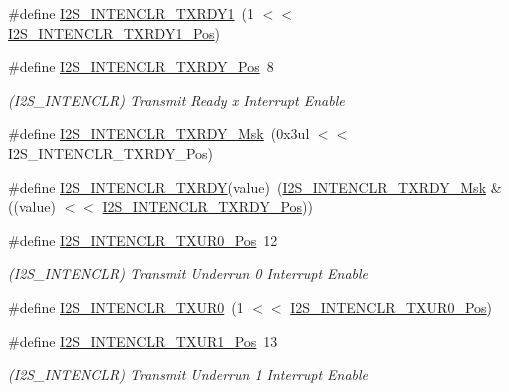 \begin{DoxyCompactItemize}
\#define \mbox{\hyperlink{group___s_a_m_d21___i2_s_gac3e4c3ba6f23da81d38341a66e17d7b7}{I2\+S\+\_\+\+I\+N\+T\+E\+N\+C\+L\+R\+\_\+\+T\+X\+R\+D\+Y1}}~(1 $<$$<$ \mbox{\hyperlink{group___s_a_m_d21___i2_s_gad9aeb6db3a8f09c6c6d586b64a98e4c3}{I2\+S\+\_\+\+I\+N\+T\+E\+N\+C\+L\+R\+\_\+\+T\+X\+R\+D\+Y1\+\_\+\+Pos}})
\item 
\#define \mbox{\hyperlink{group___s_a_m_d21___i2_s_gafc89b68c83bd2907f5c7a91cd36a667f}{I2\+S\+\_\+\+I\+N\+T\+E\+N\+C\+L\+R\+\_\+\+T\+X\+R\+D\+Y\+\_\+\+Pos}}~8
\begin{DoxyCompactList}\small\item\em (I2\+S\+\_\+\+I\+N\+T\+E\+N\+C\+LR) Transmit Ready x Interrupt Enable \end{DoxyCompactList}\item 
\#define \mbox{\hyperlink{group___s_a_m_d21___i2_s_ga4478cdcdd49295aa9290fe7cbaa24402}{I2\+S\+\_\+\+I\+N\+T\+E\+N\+C\+L\+R\+\_\+\+T\+X\+R\+D\+Y\+\_\+\+Msk}}~(0x3ul $<$$<$ I2\+S\+\_\+\+I\+N\+T\+E\+N\+C\+L\+R\+\_\+\+T\+X\+R\+D\+Y\+\_\+\+Pos)
\item 
\#define \mbox{\hyperlink{group___s_a_m_d21___i2_s_gafaf0d1c25089b67ff674b4082c9e3c57}{I2\+S\+\_\+\+I\+N\+T\+E\+N\+C\+L\+R\+\_\+\+T\+X\+R\+DY}}(value)~(\mbox{\hyperlink{group___s_a_m_d21___i2_s_ga4478cdcdd49295aa9290fe7cbaa24402}{I2\+S\+\_\+\+I\+N\+T\+E\+N\+C\+L\+R\+\_\+\+T\+X\+R\+D\+Y\+\_\+\+Msk}} \& ((value) $<$$<$ \mbox{\hyperlink{group___s_a_m_d21___i2_s_gafc89b68c83bd2907f5c7a91cd36a667f}{I2\+S\+\_\+\+I\+N\+T\+E\+N\+C\+L\+R\+\_\+\+T\+X\+R\+D\+Y\+\_\+\+Pos}}))
\item 
\#define \mbox{\hyperlink{group___s_a_m_d21___i2_s_ga40a52fbc12775b89db0e5e917beaba8d}{I2\+S\+\_\+\+I\+N\+T\+E\+N\+C\+L\+R\+\_\+\+T\+X\+U\+R0\+\_\+\+Pos}}~12
\begin{DoxyCompactList}\small\item\em (I2\+S\+\_\+\+I\+N\+T\+E\+N\+C\+LR) Transmit Underrun 0 Interrupt Enable \end{DoxyCompactList}\item 
\#define \mbox{\hyperlink{group___s_a_m_d21___i2_s_ga47c148cc316ca37aaac8705127808cbf}{I2\+S\+\_\+\+I\+N\+T\+E\+N\+C\+L\+R\+\_\+\+T\+X\+U\+R0}}~(1 $<$$<$ \mbox{\hyperlink{group___s_a_m_d21___i2_s_ga40a52fbc12775b89db0e5e917beaba8d}{I2\+S\+\_\+\+I\+N\+T\+E\+N\+C\+L\+R\+\_\+\+T\+X\+U\+R0\+\_\+\+Pos}})
\item 
\#define \mbox{\hyperlink{group___s_a_m_d21___i2_s_ga8e6e57c754c211623784759da161c01d}{I2\+S\+\_\+\+I\+N\+T\+E\+N\+C\+L\+R\+\_\+\+T\+X\+U\+R1\+\_\+\+Pos}}~13
\begin{DoxyCompactList}\small\item\em (I2\+S\+\_\+\+I\+N\+T\+E\+N\+C\+LR) Transmit Underrun 1 Interrupt Enable \end{DoxyCompactList}\item 

\end{DoxyCompactItemize}
